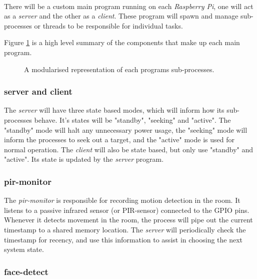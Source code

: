 \documentclass[11pt,a4paper,titlepage]{report}
\newcommand{\rpi}{\textit{Raspberry Pi\textsuperscript{\textregistered}}}
\begin{document}
There will be a custom main program running on each \rpi, one will act as a \textit{server} and the other as a \textit{client}. These program will spawn and manage sub-processes or threads to be responsible for individual tasks.

Figure \ref{fig:processes} is a high level summary of the components that make up each main program.

\begin{figure}
\begin{multicols}{2}
\columnbreak
{}
\end{multicols}
\caption{A modularised representation of each programs sub-processes.}\label{fig:processes}
\end{figure}

\subsubsection{server and client}


The \textit{server} will have three state based modes, which will inform how its sub-processes behave. It's states will be "standby", "seeking" and "active". The "standby" mode will halt any unnecessary power usage, the "seeking" mode will inform the processes to seek out a target, and the "active" mode is used for normal operation. 
The \textit{client} will also be state based, but only use "standby" and "active". Its state is updated by the \textit{server} program.


\subsubsection{pir-monitor}

The \textit{pir-monitor} is responsible for recording motion detection in the room. It listens to a passive infrared sensor (or PIR-sensor) connected to the GPIO pins. Whenever it detects movement in the room, the process will pipe out the current timestamp to a shared memory location. The \textit{server} will periodically check the timestamp for recency, and use this information to assist in choosing the next system state.


\subsubsection{face-detect}
\end{document}
